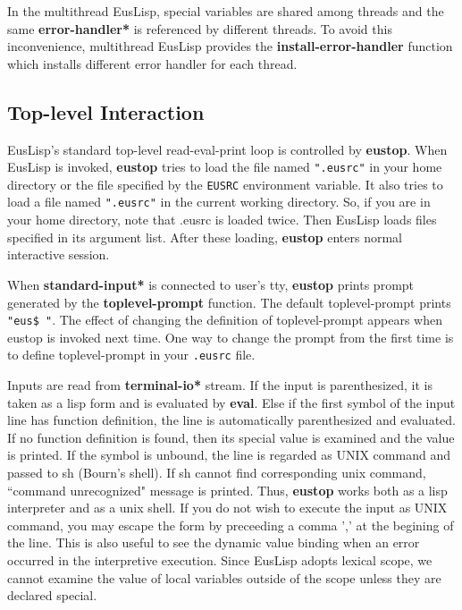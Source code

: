 In the multithread EusLisp, special variables are shared among threads
and the same {\bf *error-handler*} is referenced by different threads.
To avoid this inconvenience, multithread EusLisp provides
the {\bf install-error-handler} function which installs different
error handler for each thread.

\begin{refdesc}

\end{refdesc}

\newpage

\subsection{Top-level Interaction}

EusLisp's standard top-level read-eval-print loop is controlled by {\bf eustop}.
When EusLisp is invoked,
{\bf eustop} tries to load the file named {\tt ".eusrc"} in your home directory
or the file specified by the {\tt EUSRC} environment variable.
It also tries to load a file named {\tt ".eusrc"} in the current working
directory.  So, if you are in your home directory, note that .eusrc is
loaded twice.
Then EusLisp loads files specified in its argument list.
After these loading, {\bf eustop} enters normal interactive session.

When {\bf *standard-input*} is connected to user's tty,
{\bf eustop} prints prompt generated by the {\bf toplevel-prompt} function.
The default toplevel-prompt prints {\tt "eus\$ "}.
The effect of changing the definition of toplevel-prompt appears
when eustop is invoked next time.
One way to change the prompt from the first time is to define
toplevel-prompt in your {\tt .eusrc} file.

Inputs are read from {\bf *terminal-io*} stream.
If the input is parenthesized, it is taken as a lisp form and
is evaluated by {\bf eval}.
Else if the first symbol of the input line has function definition,
the line is automatically parenthesized and evaluated.
If no function definition is found,
then its special value is examined and the value is printed.
If the symbol is unbound,
the line is regarded as UNIX command and passed to sh (Bourn's shell).
If sh cannot find corresponding unix command,
``command unrecognized" message is printed.
Thus, {\bf eustop} works both as a lisp interpreter and as a unix shell.
If you do not wish to execute the input as UNIX command,
you may escape the form by preceeding a comma ',' at the begining of the line.
This is also useful to see the dynamic value binding when
an error occurred in the interpretive execution.
Since EusLisp adopts lexical scope,
we cannot examine the value of local variables outside of the scope
unless they are declared special.

